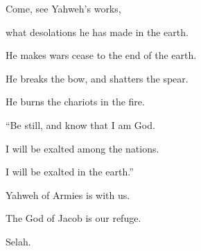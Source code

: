 {\BB \par }{\Q {}Come, see Yahweh’s works,
\par }{\QB what desolations he has made in the earth.
\par }{\Q {}He makes wars cease to the end of the earth.
\par }{\QB He breaks the bow, and shatters the spear.
\par }{\QB He burns the chariots in the fire.
\par }{\Q {}“Be still, and know that I am God.
\par }{\QB I will be exalted among the nations.
\par }{\QB I will be exalted in the earth.”
\par }{\Q {}Yahweh of Armies is with us.
\par }{\QB The God of Jacob is our refuge.
\par }{\QS Selah.\par }
{\BB \par }
